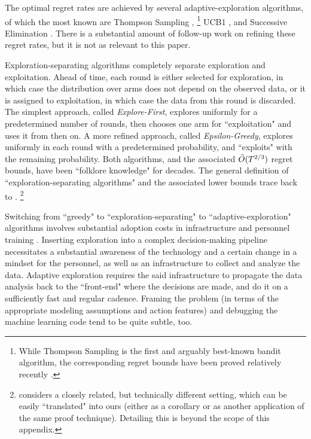 The optimal regret rates are achieved by several adaptive-exploration  algorithms, of which the most known are
Thompson Sampling \citep{Thompson-1933,TS-survey-FTML18},%
\footnote{While Thompson Sampling is the first and arguably best-known bandit algorithm, the corresponding regret bounds have been proved relatively recently \citep{Shipra-colt12,Kaufmann-alt12,Shipra-aistats13}.}
UCB1 \citep{bandits-ucb1},
and Successive Elimination \citep{EvenDar-icml06}. There is a substantial amount of follow-up work on refining these regret rates, but it is not as relevant to this paper.

Exploration-separating algorithms completely separate exploration and exploitation. Ahead of time, each round is either selected for exploration, in which case  the distribution over arms does not depend on the observed data, or it is assigned to exploitation, in which case the data from this round is discarded. The simplest approach, called \emph{Explore-First}, explores uniformly for a predetermined number of rounds, then chooses one arm for ``exploitation" and uses it from then on. A more refined approach, called \emph{Epsilon-Greedy}, explores uniformly in each round with a predetermined probability, and ``exploits" with the remaining probability. Both algorithms, and the associated $\tilde{O}(T^{2/3})$ regret bounds, have been ``folklore knowledge" for decades. The general definition of ``exploration-separating algorithms" and the associated lower bounds trace back to \citet{MechMAB-ec09}.%
\footnote{\citet{MechMAB-ec09} considers a closely related, but technically different setting, which can be easily ``translated" into ours (either as a corollary or as another application of the same proof technique). Detailing this is beyond the scope of this appendix.}


Switching from ``greedy" to ``exploration-separating" to ``adaptive-exploration" algorithms involves substantial adoption costs in infrastructure and personnel training \citep{DS-arxiv}. Inserting exploration into a complex decision-making pipeline necessitates a substantial awareness of the technology and a certain change in a mindset for the personnel, as well as an infrastructure to collect and analyze the data. Adaptive exploration requires the said infrastructure to propagate the data analysis back to the ``front-end" where the decisions are made, and do it on a sufficiently fast and regular cadence. Framing the problem (in terms of the appropriate modeling assumptions and action features) and debugging the machine learning code tend to be quite subtle, too.

